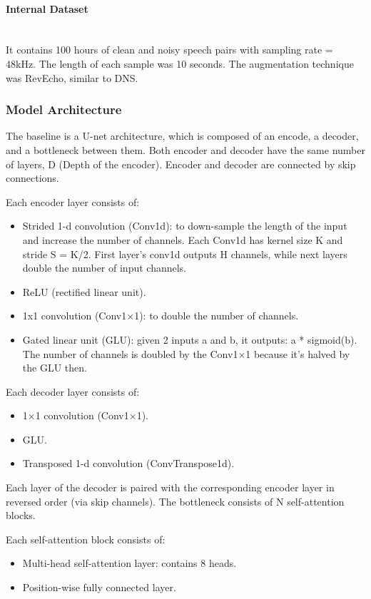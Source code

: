 \paragraph{Internal Dataset}\mbox{}\\
It contains 100 hours of clean and noisy speech pairs with sampling rate = 48kHz. The length of each sample was 10 seconds. The augmentation technique was RevEcho, similar to DNS.

\subsubsection{Model Architecture}
The baseline is a U-net architecture, which is composed of an encode, a decoder, and a bottleneck between them. Both encoder and decoder have the same number of layers, D (Depth of the encoder). Encoder and decoder are connected by skip connections.

Each encoder layer consists of:
\begin{itemize}
    \item Strided 1-d convolution (Conv1d): to down-sample the length of the input and increase the number of channels. Each Conv1d has kernel size K and stride S = K/2. First layer's conv1d outputs H channels, while next layers double the number of input channels.
    \item ReLU (rectified linear unit).
    \item 1x1 convolution (Conv1×1): to double the number of channels.
    \item Gated linear unit (GLU): given 2 inputs a and b, it outputs: a * sigmoid(b). The number of channels is doubled by the Conv1×1 because it's halved by the GLU then.
\end{itemize}

Each decoder layer consists of:
\begin{itemize}
    \item 1×1 convolution (Conv1×1).
    \item GLU.
    \item Transposed 1-d convolution (ConvTranspose1d).
\end{itemize}

Each layer of the decoder is paired with the corresponding encoder layer in reversed order (via skip channels). The bottleneck consists of N self-attention blocks.

Each self-attention block consists of:
\begin{itemize}
    \item Multi-head self-attention layer: contains 8 heads.
    \item Position-wise fully connected layer.
\end{itemize}

